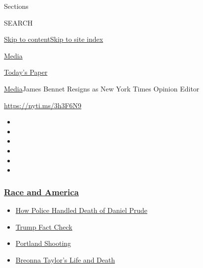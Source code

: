 Sections

SEARCH

\protect\hyperlink{site-content}{Skip to
content}\protect\hyperlink{site-index}{Skip to site index}

\href{https://www.nytimes3xbfgragh.onion/section/business/media}{Media}

\href{https://myaccount.nytimes3xbfgragh.onion/auth/login?response_type=cookie\&client_id=vi}{}

\href{https://www.nytimes3xbfgragh.onion/section/todayspaper}{Today's
Paper}

\href{/section/business/media}{Media}\textbar{}James Bennet Resigns as
New York Times Opinion Editor

\url{https://nyti.ms/3h3F6N9}

\begin{itemize}
\item
\item
\item
\item
\item
\item
\end{itemize}

\hypertarget{race-and-america}{%
\subsubsection{\texorpdfstring{\href{https://www.nytimes3xbfgragh.onion/news-event/george-floyd-protests-minneapolis-new-york-los-angeles?name=styln-george-floyd\&region=TOP_BANNER\&block=storyline_menu_recirc\&action=click\&pgtype=Article\&impression_id=83afd820-f1dc-11ea-9405-6340528db289\&variant=undefined}{Race
and America}}{Race and America}}\label{race-and-america}}

\begin{itemize}
\tightlist
\item
  \href{https://www.nytimes3xbfgragh.onion/2020/09/04/nyregion/rochester-police-daniel-prude.html?name=styln-george-floyd\&region=TOP_BANNER\&block=storyline_menu_recirc\&action=click\&pgtype=Article\&impression_id=83afff30-f1dc-11ea-9405-6340528db289\&variant=undefined}{How
  Police Handled Death of Daniel Prude}
\item
  \href{https://www.nytimes3xbfgragh.onion/2020/09/01/us/politics/trump-fact-check-protests.html?name=styln-george-floyd\&region=TOP_BANNER\&block=storyline_menu_recirc\&action=click\&pgtype=Article\&impression_id=83afff31-f1dc-11ea-9405-6340528db289\&variant=undefined}{Trump
  Fact Check}
\item
  \href{https://www.nytimes3xbfgragh.onion/2020/08/30/us/portland-shooting-explained.html?name=styln-george-floyd\&region=TOP_BANNER\&block=storyline_menu_recirc\&action=click\&pgtype=Article\&impression_id=83afff32-f1dc-11ea-9405-6340528db289\&variant=undefined}{Portland
  Shooting}
\item
  \href{https://www.nytimes3xbfgragh.onion/2020/08/30/us/breonna-taylor-police-killing.html?name=styln-george-floyd\&region=TOP_BANNER\&block=storyline_menu_recirc\&action=click\&pgtype=Article\&impression_id=83afff33-f1dc-11ea-9405-6340528db289\&variant=undefined}{Breonna
  Taylor's Life and Death}
\end{itemize}


